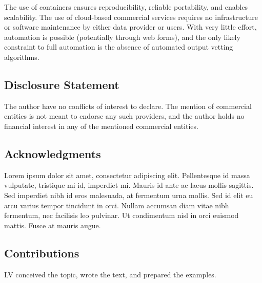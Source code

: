 \documentclass[]{hdsr}
\begin{document}
The use of containers ensures reproducibility, reliable portability, and enables scalability. The use of cloud-based commercial services requires no infrastructure or software maintenance by either data provider or users. With very little effort, automation is possible (potentially through web forms), and the only likely constraint to full automation is the absence of automated output vetting algorithms. 

























\subsection*{Disclosure Statement}
The author have no conflicts of interest to declare. The mention of commercial entities is not meant to endorse any such providers, and the author holds no financial interest in any of the mentioned commercial entities.

\subsection*{Acknowledgments}
Lorem ipsum dolor sit amet, consectetur adipiscing elit. Pellentesque id massa vulputate, tristique mi id, imperdiet mi. Mauris id ante ac lacus mollis sagittis. Sed imperdiet nibh id eros malesuada, at fermentum urna mollis. Sed id elit eu arcu varius tempor tincidunt in orci. Nullam accumsan diam vitae nibh fermentum, nec facilisis leo pulvinar. Ut condimentum nisl in orci euismod mattis. Fusce at mauris augue. 

\subsection*{Contributions}

LV conceived the topic, wrote the text, and prepared the examples.


\appendix




\printbibliography
\end{document}
